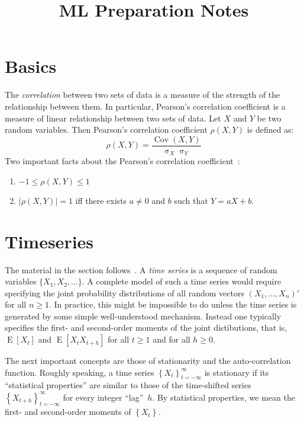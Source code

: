 \documentclass[11pt,a4]{article}
\title{ML Preparation Notes}
\DeclareMathOperator{\cov}{Cov}
\DeclareMathOperator{\sd}{\sigma}
\DeclareMathOperator{\E}{E}
\newcommand{\ts}[3]{\ensuremath{\left \{ #1 \right \}_{#2}^{#3}}}
\theoremstyle{definition}
\begin{document}
\maketitle

\section{Basics}

The \emph{correlation} between two sets of data is a measure of the strength of
the relationship between them. In particular, Pearson's correlation coefficient
is a measure of linear relationship between two sets of data. Let $X$ and $Y$
be two random variables. Then Pearson's correlation coefficient $\rho(X, Y)$ is
defined as:
\begin{equation}
    \rho(X, Y) = \frac{\cov(X, Y)}{\sd_X \sd_Y} 
\end{equation}  
Two important facts about the Pearson's correlation coefficient~\cite{CasBer}:
\begin{enumerate}
	\item $-1 \leq \rho(X, Y) \leq 1$
	\item $|\rho(X, Y)| = 1$ iff there exists $a \neq 0$ and $b$ such that 
	$Y = aX + b$.
\end{enumerate}


\section{Timeseries}

The material in the section follows~\cite{BroDav}. A \emph{time series} is a
sequence of random variables $\{X_1, X_2, \ldots \}$. A complete model of such
a time series would require specifying the joint probability distributions of
all random vectors $(X_1, \ldots, X_n)'$ for all $n \geq 1$. In practice, this
might be impossible to do unless the time series is generated by some simple
well-understood mechanism. Instead one typically specifies the first- and
second-order moments of the joint distibutions, that is, $\E[X_t]$ and $\E[X_t
X_{t + h}]$ for all $t \geq 1$ and for all $h \geq 0$. 

The next important concepts are those of stationarity and the auto-correlation
function. Roughly speaking, a time series $\ts{X_t}{t = -\infty}{\infty}$ is
stationary if its ``statistical properties'' are similar to those of the
time-shifted series $\ts{X_{t + h}}{t = -\infty}{\infty}$ for every integer
``lag''~$h$. By statistical properties, we mean the first- and second-order
moments of $\ts{X_t}{}{}$. 
\end{document}
